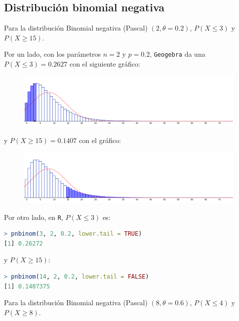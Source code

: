 \subsection{Distribución binomial negativa}
\begin{ejer}[1]
	 Para la distribución Binomial negativa (Pascal) $(2, \theta = 0.2)$, $P(X \leq 3)$ y $P(X\geq 15)$.
\end{ejer}
\begin{sol}
	Por un lado, con los parámetros $n=2$ y $p=0.2$, \texttt{Geogebra} da una $P(X\leq 3) = 0.2627$ con el siguiente gráfico:
	\begin{figure}[H]
	\includegraphics[width=0.5\linewidth]{pics/g8}
	\centering
	\end{figure}\noindent
	y $P(X\geq 15) = 0.1407$ con el gráfico:
	\begin{figure}[H]
	\includegraphics[width=0.5\linewidth]{pics/g8-2}
	\centering
	\end{figure}\noindent
	Por otro lado, en \texttt{R}, $P(X\leq 3)$ es:
	\begin{lstlisting}[language=R]
> pnbinom(3, 2, 0.2, lower.tail = TRUE)
[1] 0.26272
	\end{lstlisting}
	y $P(X\geq 15)$:
	\begin{lstlisting}[language=R]
> pnbinom(14, 2, 0.2, lower.tail = FALSE)
[1] 0.1407375
	\end{lstlisting}
\end{sol}
\begin{ejer}
		 Para la distribución Binomial negativa (Pascal) $(8, \theta = 0.6)$, $P(X \leq 4)$ y $P(X\geq 8)$.
\end{ejer}
